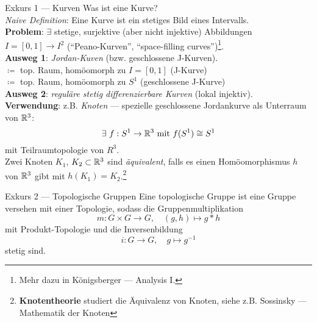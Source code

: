 \begin{remark}{Exkurs 1 --- Kurven}
  Was ist eine Kurve? \\
  \emph{Naive Definition}: Eine Kurve ist ein stetiges Bild eines Intervalls. \\
  \textbf{Problem}: $ \exists $ stetige, surjektive (aber nicht injektive) Abbildungen $ I = [0,1] \to I^2 $ (``Peano-Kurven'', ``space-filling curves'')\footnote{Mehr dazu in Königsberger --- Analysis I.}. \\
  \textbf{Ausweg 1}: \emph{Jordan-Kuven} (bzw. geschlossene J-Kurven). \\
    $ \coloneqq $ top. Raum, homöomorph zu $ I = [0,1] $ (J-Kurve) \\
    $ \coloneqq $ top. Raum, homöomorph zu $ S^1 $ (geschlossene J-Kurve) \\
  \textbf{Ausweg 2}: \emph{reguläre stetig differenzierbare Kurven} (lokal injektiv). \\
  \textbf{Verwendung}: z.B. \emph{Knoten} --- spezielle geschlossene Jordankurve als Unterraum von $ \mathbb{R}^3 $:
  \begin{equation*}
    \exists \ f : S^1 \to \mathbb{R}^3 \text{ mit } f(S^1) \cong S^1
  \end{equation*}
  mit Teilraumtopologie von $ R^3 $. \\
  Zwei Knoten $ K_1 $, $ K_2 \subset \mathbb{R}^3 $ sind \emph{äquivalent}, falls es einen Homöomorphismus $ h $ von $ \mathbb{R}^3 $ gibt mit $ h(K_1) = K_2 $.\footnote{\textbf{Knotentheorie} studiert die Äquivalenz von Knoten, siehe z.B. Sossinsky --- Mathematik der Knoten}
\end{remark}

\begin{remark}{Exkurs 2 --- Topologische Gruppen}
  Eine topologische Gruppe ist eine Gruppe versehen mit einer Topologie, sodass die Gruppenmultiplikation
  \begin{equation*}
    m: G \times G \to G, \quad (g,h) \mapsto g*h
  \end{equation*}
  mit Produkt-Topologie und die Inversenbildung
  \begin{equation*}
    i: G \to G, \quad g \mapsto g^{-1 }
  \end{equation*}
  stetig sind.
\end{remark}

